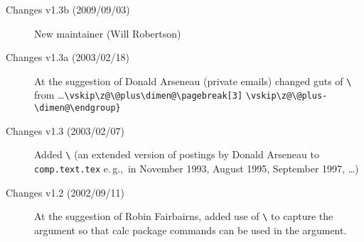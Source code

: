 \documentclass[pagesize=auto, fontsize=12pt, DIV=11]{scrartcl}
\makeatletter
\newcommand*{\pkg}[1]{\textsf{#1}}
\newcommand*{\cs}[1]{\texttt{\textbackslash#1}}
\newcommand*{\cmd}[1]{\cs{\expandafter\@gobble\string#1}}
\makeatother
\begin{document}
\begin{description}
\item[Changes v1.3b (2009/09/03)]
  New maintainer (Will Robertson)
  
\item[Changes v1.3a (2003/02/18)]
  At the suggestion of Donald Arseneau (private emails) changed guts of
  \cmd{\needspace} from 
  \ldots\verb+\vskip\z@\@plus\dimen@\pagebreak[3]+\allowbreak
  \verb+\vskip\z@\@plus-\dimen@\endgroup}+

\item[Changes v1.3 (2003/02/07)]
  Added \cmd{\Needspace} (an extended version of postings by Donald Arseneau 
  to \texttt{comp.text.tex} e.\,g.,\ in November 1993, August 1995, September 1997, \ldots)
  
\item[Changes v1.2 (2002/09/11)]
  At the suggestion of Robin Fairbairns, added use of \cmd{\dimen@} to capture 
  the argument so that \pkg{calc} package commands can be used in the argument.
\end{description}
\end{document}
